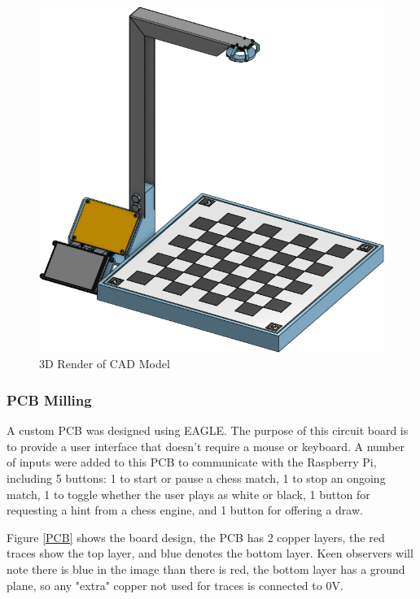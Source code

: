 \documentclass[journal]{IEEEtran}
\begin{document}
\begin{figure}[!ht]
	\centering
	\includegraphics[width=\linewidth]{Images/Render.png}
	\caption{3D Render of CAD Model}
	\label{render}
\end{figure}

\vspace{12pt}

\subsubsection{PCB Milling}
A custom PCB was designed using EAGLE. The purpose of this circuit board is to provide a user interface that doesn't require a mouse or keyboard. A number of inputs were added to this PCB to communicate with the Raspberry Pi, including 5 buttons: 1 to start or pause a chess match, 1 to stop an ongoing match, 1 to toggle whether the user plays as white or black, 1 button for requesting a hint from a chess engine, and 1 button for offering a draw.

Figure \ref{PCB} shows the board design, the PCB has 2 copper layers, the red traces show the top layer, and blue denotes the bottom layer. Keen observers will note there is blue in the image than there is red, the bottom layer has a ground plane, so any "extra" copper not used for traces is connected to 0V.
\end{document}
